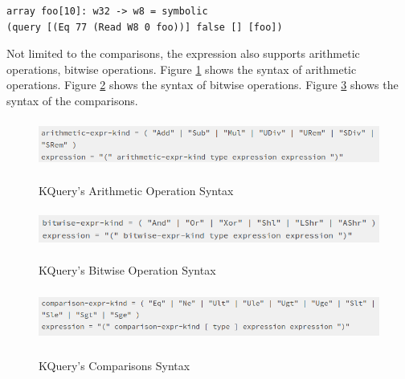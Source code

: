 \begin{spacing}{1}
{
\begin{lstlisting}[frame=shadowbox, caption={KQuery},label={kquery}]
array foo[10]: w32 -> w8 = symbolic
(query [(Eq 77 (Read W8 0 foo))] false [] [foo])
\end{lstlisting}
}
\end{spacing}

Not limited to the comparisons, the expression also supports arithmetic operations, bitwise operations. Figure \ref{arithmetic_operations} shows the syntax of arithmetic operations. Figure \ref{bitwise_operations} shows the syntax of bitwise operations. Figure \ref{comparisons} shows the syntax of the comparisons.

\begin{figure}[h]%
\begin{center}
{\mbox{\includegraphics[height=45pt]{figures/arithmetic.png}}}
\end{center}
\caption{\label{arithmetic_operations}KQuery's Arithmetic Operation Syntax}
\end{figure}

\begin{figure}[h]%
\begin{center}
{\mbox{\includegraphics[height=35pt]{figures/bitwise.png}}}
\end{center}
\caption{\label{bitwise_operations}KQuery's Bitwise Operation Syntax}
\end{figure}

\begin{figure}[h]%
\begin{center}
{\mbox{\includegraphics[height=50pt]{figures/comparisons.png}}}
\end{center}
\caption{\label{comparisons}KQuery's Comparisons Syntax}
\end{figure}

